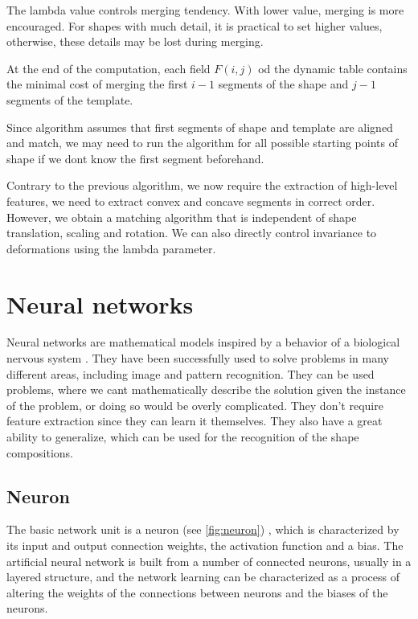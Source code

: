 The lambda value controls merging tendency. With lower value, merging is more encouraged. For shapes with much detail, it is practical to set higher values, otherwise, these details may be lost during merging. 

At the end of the computation, each field $F(i,j)$ od the dynamic table contains the minimal cost of merging the first $i-1$ segments of the shape and $j-1$ segments of the template. 

Since  algorithm assumes\XX{,} that first segments of shape and template are aligned and match, we may need to run the algorithm for all possible starting points of shape if we dont know the first segment beforehand.

Contrary to  the previous algorithm, we now require the extraction of high-level features, we need to extract convex and concave segments in correct order. However, we obtain a matching algorithm that is independent of shape translation, scaling and rotation. We can also directly control  invariance to deformations using the lambda parameter.

\section{Neural networks}
Neural networks are mathematical models  inspired by a behavior of a biological nervous system \cite{bishop}. They have been successfully used to solve problems in many different areas, including image and pattern recognition. They can be used   problems, where we cant mathematically describe the solution given the instance of the problem, or doing so would be overly complicated.   They don't require feature extraction since they can learn it themselves. They also have a great ability to generalize, which can be used for the recognition of the shape compositions.

\subsection{Neuron}
 The basic network unit is a neuron (see \cref{fig:neuron}) , which is characterized by its input and output connection weights, the activation function and a bias. The artificial neural network is built from a number of connected neurons, usually in a layered structure, and the network learning  can be characterized as a process of altering the weights of the connections between neurons and the biases of the neurons.

